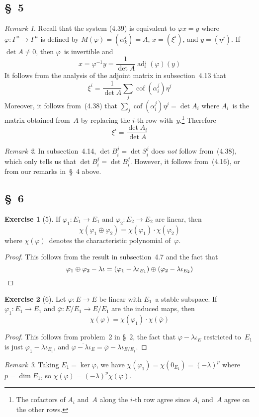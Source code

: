 \documentclass[letterpaper,12pt]{article}
\DeclareMathOperator{\adj}{adj}
\DeclareMathOperator{\cof}{cof}
\newcommand{\dsum}{\oplus}
\newcommand{\mult}{\cdot}
\theoremstyle{definition}
\newtheorem*{exer}{Exercise}
\theoremstyle{remark}
\newtheorem*{rmk}{Remark}
\begin{document}
\subsection*{\S~5}
\begin{rmk}
Recall that the system (4.39) is equivalent to \(\varphi x=y\) where \(\varphi:\Gamma^n\to\Gamma^n\) is defined by \(M(\varphi)=(\alpha^j_k)=A\), \(x=(\xi^i)\), and \(y=(\eta^j)\). If \(\det A\ne0\), then \(\varphi\)~is invertible and
\[x=\varphi^{-1}y=\frac{1}{\det A}\adj(\varphi)(y)\]
It follows from the analysis of the adjoint matrix in subsection~4.13 that
\[\xi^i=\frac{1}{\det A}\sum_j\cof(\alpha^j_i)\eta^j\]
Moreover, it follows from~(4.38) that \(\sum_j\cof(\alpha^j_i)\eta^j=\det A_i\) where \(A_i\)~is the matrix obtained from~\(A\) by replacing the \(i\)-th row with~\(y\).\footnote{The cofactors of \(A_i\) and~\(A\) along the \(i\)-th row agree since \(A_i\) and~\(A\) agree on the other rows.} Therefore
\[\xi^i=\frac{\det A_i}{\det A}\]
\end{rmk}

\begin{rmk}
In subsection~4.14, \(\det B^j_i=\det S^j_i\) does \emph{not} follow from~(4.38), which only tells us that \(\det B^j_i=\det B^j_i\). However, it follows from~(4.16), or from our remarks in~\S~4 above.
\end{rmk}

\subsection*{\S~6}
\begin{exer}[5]
If \(\varphi_1:E_1\to E_1\) and \(\varphi_2:E_2\to E_2\) are linear, then
\[\chi(\varphi_1\dsum\varphi_2)=\chi(\varphi_1)\mult\chi(\varphi_2)\]
where \(\chi(\varphi)\)~denotes the characteristic polynomial of~\(\varphi\).
\end{exer}
\begin{proof}
This follows from the result in subsection~4.7 and the fact that
\[\varphi_1\dsum\varphi_2-\lambda\iota=(\varphi_1-\lambda\iota_{E_1})\dsum(\varphi_2-\lambda\iota_{E_2})\qedhere\]
\end{proof}

\begin{exer}[6]
Let \(\varphi:E\to E\) be linear with \(E_1\)~a stable subspace. If \(\varphi_1:E_1\to E_1\) and \(\overline{\varphi}:E/E_1\to E/E_1\) are the induced maps, then
\[\chi(\varphi)=\chi(\varphi_1)\mult\chi(\overline{\varphi})\]
\end{exer}
\begin{proof}
This follows from problem~2 in \S~2, the fact that \(\varphi-\lambda\iota_E\) restricted to~\(E_1\) is just \(\varphi_1-\lambda\iota_{E_1}\), and \(\overline{\varphi-\lambda\iota_E}=\overline{\varphi}-\lambda\iota_{E/E_1}\).
\end{proof}
\begin{rmk}
Taking \(E_1=\ker\varphi\), we have \(\chi(\varphi_1)=\chi(0_{E_1})=(-\lambda)^p\) where \(p=\dim E_1\), so \(\chi(\varphi)=(-\lambda)^p\chi(\overline{\varphi})\).
\end{rmk}
\end{document}
